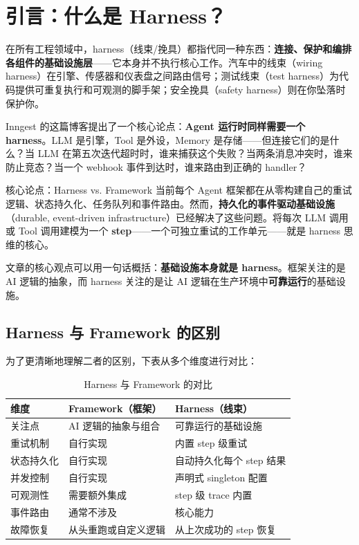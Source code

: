 \section{引言：什么是 Harness？}

在所有工程领域中，harness（线束/挽具）都指代同一种东西：\textbf{连接、保护和编排各组件的基础设施层}——它本身并不执行核心工作。汽车中的线束（wiring harness）在引擎、传感器和仪表盘之间路由信号；测试线束（test harness）为代码提供可重复执行和可观测的脚手架；安全挽具（safety harness）则在你坠落时保护你。

Inngest 的这篇博客提出了一个核心论点：\textbf{Agent 运行时同样需要一个 harness}。LLM 是引擎，Tool 是外设，Memory 是存储——但连接它们的是什么？当 LLM 在第五次迭代超时时，谁来捕获这个失败？当两条消息冲突时，谁来防止竞态？当一个 webhook 事件到达时，谁来路由到正确的 handler？

\begin{importantbox}{核心论点：Harness vs. Framework}
当前每个 Agent 框架都在从零构建自己的重试逻辑、状态持久化、任务队列和事件路由。然而，\textbf{持久化的事件驱动基础设施}（durable, event-driven infrastructure）已经解决了这些问题。将每次 LLM 调用或 Tool 调用建模为一个 \textbf{step}——一个可独立重试的工作单元——就是 harness 思维的核心。
\end{importantbox}

文章的核心观点可以用一句话概括：\textbf{基础设施本身就是 harness}。框架关注的是 AI 逻辑的抽象，而 harness 关注的是让 AI 逻辑在生产环境中\textbf{可靠运行}的基础设施。

\subsection{Harness 与 Framework 的区别}

为了更清晰地理解二者的区别，下表从多个维度进行对比：

\begin{table}[H]
\centering
\caption{Harness 与 Framework 的对比}
\begin{tabular}{lll}
\toprule
\textbf{维度} & \textbf{Framework（框架）} & \textbf{Harness（线束）} \\
\midrule
关注点 & AI 逻辑的抽象与组合 & 可靠运行的基础设施 \\
重试机制 & 自行实现 & 内置 step 级重试 \\
状态持久化 & 自行实现 & 自动持久化每个 step 结果 \\
并发控制 & 自行实现 & 声明式 singleton 配置 \\
可观测性 & 需要额外集成 & step 级 trace 内置 \\
事件路由 & 通常不涉及 & 核心能力 \\
故障恢复 & 从头重跑或自定义逻辑 & 从上次成功的 step 恢复 \\
\bottomrule
\end{tabular}
\end{table}

